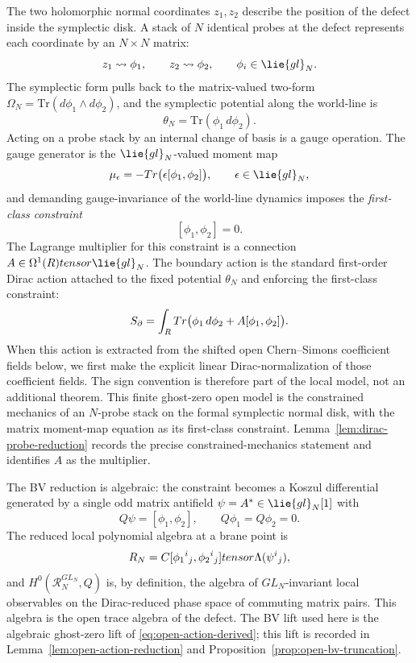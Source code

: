 \documentclass[11pt]{memoir}
\begin{document}
The two holomorphic normal coordinates $z_1,z_2$ describe the position of
the defect inside the symplectic disk. A stack of $N$ identical probes at
the defect represents each coordinate by an $N\times N$ matrix:
$$z_1\rightsquigarrow\phi_1,\qquad z_2\rightsquigarrow\phi_2,
  \qquad\phi_i\in\lie{gl}_N.$$
The symplectic form pulls back to the matrix-valued two-form
$\Omega_N=\mathrm{Tr}(d\phi_1\wedge d\phi_2)$, and the symplectic potential
along the world-line is
$$\theta_N=\mathrm{Tr}(\phi_1\,d\phi_2).$$
Acting on a probe stack by an internal change of basis is a gauge operation.
The gauge generator is the $\lie{gl}_N$-valued moment map
$$\mu_\epsilon=-\mathrm{Tr}\bigl(\epsilon[\phi_1,\phi_2]\bigr),\qquad
  \epsilon\in\lie{gl}_N,$$
and demanding gauge-invariance of the world-line dynamics imposes the
\emph{first-class constraint}
$$[\phi_1,\phi_2]=0.$$
The Lagrange multiplier for this constraint is a connection
$A\in\Omega^1(\R)\otimes\lie{gl}_N$. The boundary action is the
standard first-order Dirac action attached to the fixed potential
$\theta_N$ and enforcing the first-class constraint:
\begin{equation}\label{eq:open-action-derived}
S_\partial
  =\int_{R}Tr\bigl(\phi_1\,d\phi_2+A[\phi_1,\phi_2]\bigr).
\end{equation}
When this action is extracted from the shifted open Chern--Simons
coefficient fields below, we first make the explicit linear
Dirac-normalization of those coefficient fields.  The sign convention is
therefore part of the local model, not an additional theorem.
This finite ghost-zero open model is the constrained mechanics of an
\(N\)-probe stack on the formal symplectic normal disk, with the matrix
moment-map equation as its first-class constraint.
Lemma~\ref{lem:dirac-probe-reduction} records the precise
constrained-mechanics statement and identifies $A$ as the multiplier.

The BV reduction is algebraic: the constraint becomes a Koszul
differential generated by a single odd matrix antifield
$\psi=A^*\in\lie{gl}_N[1]$ with
\begin{equation}\label{eq:open-Q}
Q\psi=[\phi_1,\phi_2],\qquad Q\phi_1=Q\phi_2=0.
\end{equation}
The reduced local polynomial algebra at a brane point is
$$R_N
  =C[\phi_1{}^i{}_j,\phi_2{}^i{}_j]
   tensor\Lambda(\psi^i{}_j),$$
and $H^0(\mathcal R_N^{GL_N},Q)$ is, by definition, the algebra of
$GL_N$-invariant local observables on the Dirac-reduced phase space of
commuting matrix pairs. This algebra is the open trace algebra of the defect.
The BV lift used here is the algebraic ghost-zero lift of
\eqref{eq:open-action-derived}; this lift is recorded in
Lemma~\ref{lem:open-action-reduction} and
Proposition~\ref{prop:open-bv-truncation}.
\end{document}
